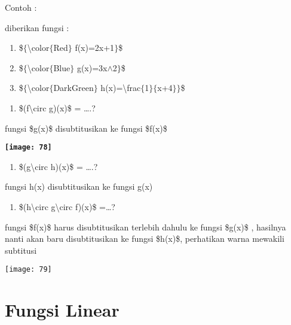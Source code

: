\documentclass[11pt,fleqn]{book} %
\begin{document}
\begin{myEnumerate}
\begin{itemize}
\noindent Contoh :

\noindent diberikan fungsi :

\begin{enumerate}
\item  \$$\{${\textbackslash}color$\{$Red$\}$ f(x)=2x+1$\}$\$

\item  \$$\{${\textbackslash}color$\{$Blue$\}$ g(x)=3x$\wedge$2$\}$\$

\item  \$$\{${\textbackslash}color$\{$DarkGreen$\}$ h(x)={\textbackslash}frac$\{$1$\}$$\{$x+4$\}$$\}$\$
\end{enumerate}

\noindent 

\begin{enumerate}
\item  \$(f{\textbackslash}circ g)(x)\$ = {\dots}.?
\end{enumerate}

\noindent fungsi \$g(x)\$ disubtitusikan ke fungsi \$f(x)\$

\begin{center}
\noindent \textbf{\texttt{[image: 78]}}
\end{center}

\begin{enumerate}
\item \textbf{ }\$(g{\textbackslash}circ h)(x)\$ = {\dots}.?
\end{enumerate}

\noindent fungsi h(x) disubtitusikan ke fungsi g(x)

\begin{enumerate}
\item  \$(h{\textbackslash}circ g{\textbackslash}circ f)(x)\$ ={\dots}?
\end{enumerate}

\noindent fungsi \$f(x)\$ harus disubtitusikan terlebih dahulu ke fungsi \$g(x)\$ , hasilnya nanti akan  baru disubtitusikan ke fungsi \$h(x)\$, perhatikan warna mewakili subtitusi

\begin{center}
\noindent \texttt{[image: 79]}
\end{center}

\noindent \textbf{}

\noindent

\section{Fungsi Linear}


\end{itemize}
\end{myEnumerate}
\end{document}

